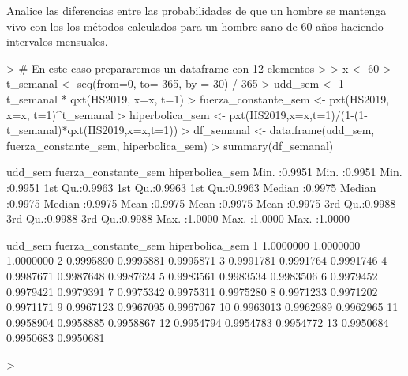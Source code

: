 \documentclass[12pt]{report}
\begin{document}
Analice las diferencias entre las probabilidades de que un hombre se mantenga vivo con los los métodos calculados para un hombre sano de 60 años haciendo intervalos mensuales.

\begin{Schunk}
\begin{Sinput}
> # En este caso prepararemos un dataframe con 12 elementos 
> 
> x <- 60
> t_semanal <- seq(from=0, to= 365, by = 30) / 365
> udd_sem <- 1 - t_semanal * qxt(HS2019, x=x, t=1)
> fuerza_constante_sem <- pxt(HS2019, x=x, t=1)^t_semanal
> hiperbolica_sem <- pxt(HS2019,x=x,t=1)/(1-(1-t_semanal)*qxt(HS2019,x=x,t=1))
> df_semanal <- data.frame(udd_sem, fuerza_constante_sem, hiperbolica_sem)
> summary(df_semanal)
\end{Sinput}
\begin{Soutput}
    udd_sem       fuerza_constante_sem hiperbolica_sem 
 Min.   :0.9951   Min.   :0.9951       Min.   :0.9951  
 1st Qu.:0.9963   1st Qu.:0.9963       1st Qu.:0.9963  
 Median :0.9975   Median :0.9975       Median :0.9975  
 Mean   :0.9975   Mean   :0.9975       Mean   :0.9975  
 3rd Qu.:0.9988   3rd Qu.:0.9988       3rd Qu.:0.9988  
 Max.   :1.0000   Max.   :1.0000       Max.   :1.0000  
\end{Soutput}
\begin{Soutput}
     udd_sem fuerza_constante_sem hiperbolica_sem
1  1.0000000            1.0000000       1.0000000
2  0.9995890            0.9995881       0.9995871
3  0.9991781            0.9991764       0.9991746
4  0.9987671            0.9987648       0.9987624
5  0.9983561            0.9983534       0.9983506
6  0.9979452            0.9979421       0.9979391
7  0.9975342            0.9975311       0.9975280
8  0.9971233            0.9971202       0.9971171
9  0.9967123            0.9967095       0.9967067
10 0.9963013            0.9962989       0.9962965
11 0.9958904            0.9958885       0.9958867
12 0.9954794            0.9954783       0.9954772
13 0.9950684            0.9950683       0.9950681
\end{Soutput}
\begin{Sinput}
> 
\end{Sinput}
\end{Schunk}
\end{document}
